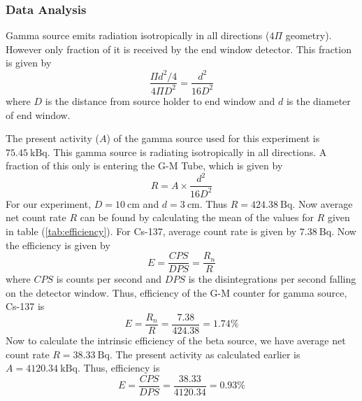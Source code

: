 \documentclass[%
 reprint,
nofootinbib,
 amsmath,amssymb,
 aps,
floatfix,
]{revtex4-2}
\begin{document}
        \subsubsection{Data Analysis}
        Gamma source emits radiation isotropically in all directions ($4 \Pi$ geometry). However only fraction of it is received by the end window detector. This fraction is given by
        \begin{equation}
            \dfrac{\Pi d^2/4}{4 \Pi D^2} = \dfrac{d^2}{16 D^2}
        \end{equation}
        where $D$ is the distance from source holder to end window and $d$ is the diameter of end window.
        \par
        The present activity ($A$) of the gamma source used for this experiment is $\SI{75.45}{\kilo \becquerel}$. This gamma source is radiating isotropically in all directions. A fraction of this only is entering the G-M Tube, which is given by
        \begin{equation}
            R = A \times \dfrac{d^2}{16 D^2}
        \end{equation}
        For our experiment, $D = \SI{10}{\centi \metre}$ and $d = \SI{3}{\centi \metre}$. Thus $R = \SI{424.38}{\becquerel}$. Now average net count rate $R$ can be found by calculating the mean of the values for $R$ given in table (\ref{tab:efficiency}). For Cs-137, average count rate is given by $\SI{7.38}{\becquerel}$. Now the efficiency is given by
        \begin{equation}
            E = \dfrac{CPS}{DPS} = \dfrac{R_n}{R}
        \end{equation}
        where $CPS$ is counts per second and $DPS$ is the disintegrations per second falling on the detector window. Thus, efficiency of the G-M counter for gamma source, Cs-137 is
        \begin{equation}
            E = \dfrac{R_n}{R} = \dfrac{7.38}{424.38} = 1.74 \%
        \end{equation}
        Now to calculate the intrinsic efficiency of the beta source, we have average net count rate $R = \SI{38.33}{\becquerel}$. The present activity as calculated earlier is $A = \SI{4120.34}{\kilo \becquerel}$. Thus, efficiency is
        \begin{equation}
            E = \dfrac{CPS}{DPS} = \dfrac{38.33}{4120.34} = 0.93 \%
        \end{equation}
\end{document}
